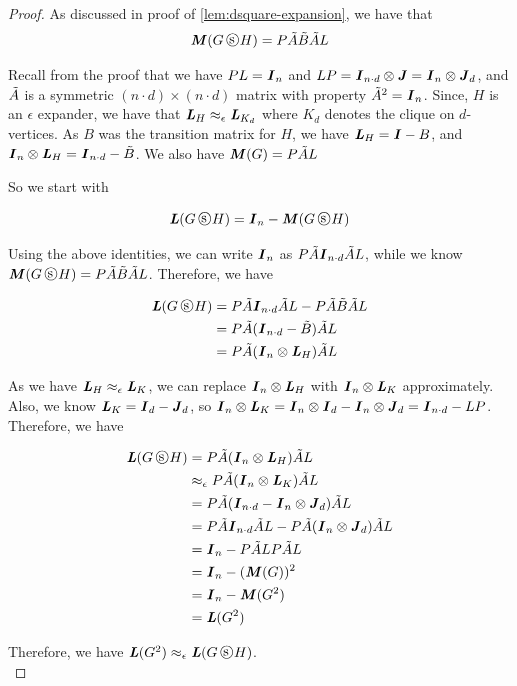 \documentclass{article}
\begin{document}
\begin{proof}
    As discussed in proof of \ref{lem:dsquare-expansion}, we have that 
    $$\MM(G\dsquare H)= P\tilde{A}\tilde{B}\tilde{A}L$$

    Recall from the proof that we have $PL=\boldsymbol{\mathit{I}}_n$ and $LP=\boldsymbol{\mathit{I}}_{n\cdot d}\otimes \boldsymbol{\mathit{J}}=\boldsymbol{\mathit{I}}_n\otimes \boldsymbol{\mathit{J}}_d$, and $\Tilde{A}$ is a symmetric $(n\cdot d)\times (n\cdot d)$ matrix with property $\Tilde{A}^2=\boldsymbol{\mathit{I}}_n$. Since, $H$ is an $\epsilon$ expander, we have that $\boldsymbol{\mathit{L}}_H\approx_\epsilon\boldsymbol{\mathit{L}}_{K_d}$ where $K_d$ denotes the clique on $d$-vertices. As $B$ was the transition matrix for $H$, we have $\boldsymbol{\mathit{L}}_H=\boldsymbol{\mathit{I}}-B$, and $\boldsymbol{\mathit{I}}_{n}\otimes \boldsymbol{\mathit{L}}_H=\boldsymbol{\mathit{I}}_{n\cdot d}-\Tilde{B}$. We also have $\boldsymbol{\mathit{M}}(G)=P\Tilde{A}L$

    So we start with 

    $$\LL(G\dsquare H)=\II_n-\MM(G\dsquare H)$$

    Using the above identities, we can write $\boldsymbol{\mathit{I}}_n$ as $P\tilde{A}\boldsymbol{\mathit{I}}_{n\cdot d}\tilde{A}L$, while we know $\MM(G\dsquare H)= P\tilde{A}\tilde{B}\tilde{A}L$. Therefore, we have

    \begin{align*}
        \LL(G\dsquare H)&=P\tilde{A}\II_{n\cdot d}\tilde{A}L-P\tilde{A}\tilde{B}\tilde{A}L\\
        &=P\tilde{A}(\II_{n\cdot d}-\tilde{B})\tilde{A}L\\
        &=P\tilde{A}(\II_{n}\otimes \LL_H)\tilde{A}L
    \end{align*}

    As we have $\boldsymbol{\mathit{L}}_H\approx_\epsilon\boldsymbol{\mathit{L}}_K$, we can replace $\boldsymbol{\mathit{I}}_{n}\otimes \boldsymbol{\mathit{L}}_H$ with $\boldsymbol{\mathit{I}}_{n}\otimes \boldsymbol{\mathit{L}}_K$ approximately. Also, we know $\boldsymbol{\mathit{L}}_K=\boldsymbol{\mathit{I}}_d-\boldsymbol{\mathit{J}}_d$, so $\boldsymbol{\mathit{I}}_{n}\otimes \boldsymbol{\mathit{L}}_K=\boldsymbol{\mathit{I}}_n\otimes \boldsymbol{\mathit{I}}_d-\boldsymbol{\mathit{I}}_n\otimes\boldsymbol{\mathit{J}}_d=\boldsymbol{\mathit{I}}_{n\cdot d}-LP$. Therefore, we have


    \begin{align*}
        \LL(G\dsquare H)&=P\tilde{A}(\II_{n}\otimes \LL_H)\tilde{A}L\\
        &\approx_\epsilon P\tilde{A}(\II_{n}\otimes \LL_K)\tilde{A}L\\
        &=P\tilde{A}(\II_{n\cdot d}-\II_n\otimes\JJ_d)\tilde{A}L\\
        &=P\tilde{A}\II_{n\cdot d}\tilde{A}L-P\tilde{A}(\II_n\otimes\JJ_d)\tilde{A}L\\
        &=\II_n-P\tilde{A}LP\tilde{A}L\\
        &=\II_n-(\MM(G))^2\\
        &=\II_n-\MM(G^2)\\
        &=\LL(G^2)
    \end{align*}

    Therefore, we have $\LL(G^2)\approx_{\epsilon}\LL(G\dsquare H)$.\\
\end{proof}
\end{document}
